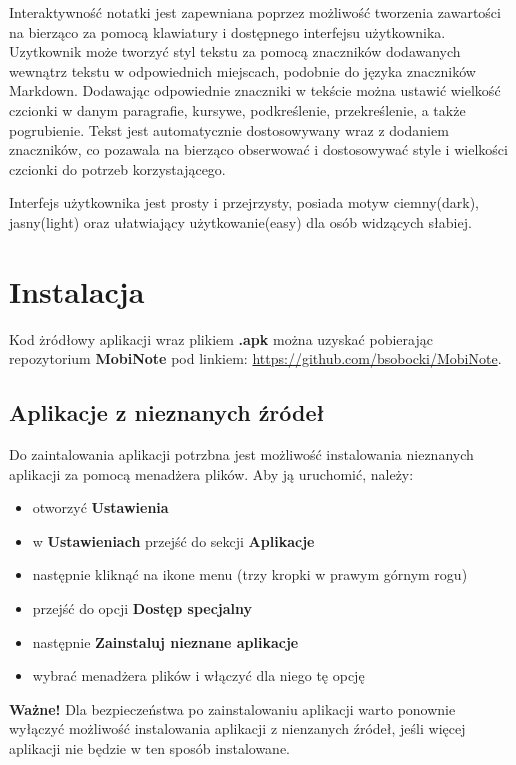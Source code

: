 \documentclass[shortabstract]{iithesis}
\begin{document}
Interaktywność notatki jest zapewniana poprzez możliwość tworzenia zawartości na bierząco za pomocą klawiatury i dostępnego interfejsu użytkownika.
Uzytkownik może tworzyć styl tekstu za pomocą znaczników dodawanych wewnątrz tekstu w odpowiednich miejscach, podobnie do języka znaczników Markdown.
Dodawając odpowiednie znaczniki w tekście można ustawić wielkość czcionki w danym paragrafie, kursywe, podkreślenie, przekreślenie, a także pogrubienie.
Tekst jest automatycznie dostosowywany wraz z dodaniem znaczników, co pozawala na bierząco obserwować i dostosowywać style i wielkości czcionki do potrzeb korzystającego.

Interfejs użytkownika jest prosty i przejrzysty, posiada motyw ciemny(dark), jasny(light) oraz ułatwiający użytkowanie(easy) dla osób widzących słabiej.

\chapter{Instalacja}

Kod żródłowy aplikacji wraz plikiem \textbf{.apk} można uzyskać pobierając repozytorium \textbf{MobiNote} pod linkiem:
\url{https://github.com/bsobocki/MobiNote}.

\section{Aplikacje z nieznanych źródeł}
Do zaintalowania aplikacji potrzbna jest możliwość instalowania nieznanych aplikacji za pomocą menadżera plików.
Aby ją uruchomić, należy:
\begin{itemize}
    \item otworzyć \textbf{Ustawienia}
    \item w \textbf{Ustawieniach} przejść do sekcji \textbf{Aplikacje}
    \item następnie kliknąć na ikone menu (trzy kropki w prawym górnym rogu)
    \item przejść do opcji \textbf{Dostęp specjalny}
    \item następnie \textbf{Zainstaluj nieznane aplikacje}
    \item wybrać menadżera plików i włączyć dla niego tę opcję
\end{itemize}

\textbf{Ważne!} Dla bezpieczeństwa po zainstalowaniu aplikacji warto ponownie wyłączyć możliwość instalowania aplikacji z nienzanych źródeł, jeśli więcej aplikacji nie będzie w ten sposób instalowane.
\end{document}
